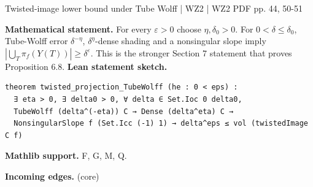 \documentclass[10pt,a4paper]{article}
\newcommand{\nodecard}[1]{\hyperlink{node-#1}{\texttt{\detokenize{#1}}}}
\begin{document}
\begin{minipage}{\linewidth}
\hypertarget{node-W2P7_1}{}
\begin{tcolorbox}[colback=white,colframe=cinematicfg,colbacktitle=cinematicbg,coltitle=ink,boxrule=0.45pt,arc=1.6mm,left=3mm,right=3mm,top=2mm,bottom=2mm,title={\sffamily\bfseries WZ2 Proposition 7.1 \hfill \texttt{W2P7\_1}}]
{\sffamily\small\color{muted}Twisted-image lower bound under Tube Wolff | WZ2 | WZ2 PDF pp. 44, 50-51}\par
\textbf{Mathematical statement.} For every $\varepsilon>0$ choose $\eta,\delta_0>0$.
For $0<\delta\le\delta_0$, Tube-Wolff error $\delta^{-\eta}$, $\delta^\eta$-dense shading and a nonsingular slope imply
$|\bigcup_T\pi_f(Y(T))|\ge\delta^\varepsilon$.
This is the stronger Section 7 statement that proves Proposition 6.8.
\smallskip\textbf{Lean statement sketch.}
\begin{Verbatim}[fontsize=\small,breaklines=true,breakanywhere=true,tabsize=2]
theorem twisted_projection_TubeWolff (he : 0 < eps) :
  ∃ eta > 0, ∃ delta0 > 0, ∀ delta ∈ Set.Ioc 0 delta0,
  TubeWolff (delta^(-eta)) C → Dense (delta^eta) C →
  NonsingularSlope f (Set.Icc (-1) 1) → delta^eps ≤ vol (twistedImage C f)
\end{Verbatim}
{\footnotesize\textbf{Mathlib support.} F, G, M, Q.\par
\textbf{Incoming edges.} \nodecard{W2Iterate} (core)\par}

\end{tcolorbox}\end{minipage}\par\medskip
\end{document}
